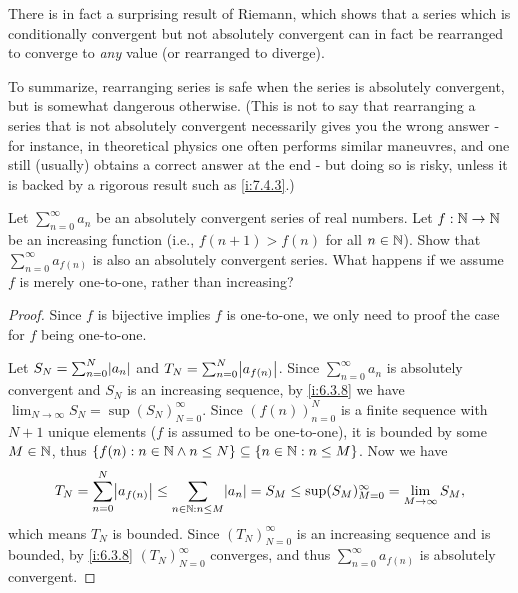 \begin{note}
  There is in fact a surprising result of Riemann, which shows that a series which is conditionally convergent but not absolutely convergent can in fact be rearranged to converge to \emph{any} value
  (or rearranged to diverge).
\end{note}

\begin{note}
  To summarize, rearranging series is safe when the series is absolutely convergent, but is somewhat dangerous otherwise.
  (This is not to say that rearranging a series that is not absolutely convergent necessarily gives you the wrong answer
  - for instance, in theoretical physics one often performs similar maneuvres, and one still (usually) obtains a correct answer at the end
  - but doing so is risky, unless it is backed by a rigorous result such as \cref{i:7.4.3}.)
\end{note}

\exercisesection

\begin{ex}\label{i:ex:7.4.1}
  Let \(\sum_{n = 0}^\infty a_n\) be an absolutely convergent series of real numbers.
  Let \(f : \mathbb{N} \to \mathbb{N}\) be an increasing function (i.e., \(f(n + 1) > f(n)\) for all \(n \in \mathbb{N}\)).
  Show that \(\sum_{n = 0}^\infty a_{f(n)}\) is also an absolutely convergent series.
  What happens if we assume \(f\) is merely one-to-one, rather than increasing?
\end{ex}

\begin{proof}
  Since \(f\) is bijective implies \(f\) is one-to-one, we only need to proof the case for \(f\) being one-to-one.

  Let \(S_N = \sum_{n = 0}^N \abs{a_n}\) and \(T_N = \sum_{n = 0}^N \abs{a_{f(n)}}\).
  Since \(\sum_{n = 0}^\infty a_n\) is absolutely convergent and \(S_N\) is an increasing sequence, by \cref{i:6.3.8} we have \(\lim_{N \to \infty} S_N = \sup(S_N)_{N = 0}^\infty\).
  Since \((f(n))_{n = 0}^N\) is a finite sequence with \(N + 1\) unique elements (\(f\) is assumed to be one-to-one), it is bounded by some \(M \in \mathbb{N}\), thus \(\left\lbrace f(n) : n \in \mathbb{N} \land n \leq N\right\rbrace \subseteq \left\lbrace n \in \mathbb{N} : n \leq M\right\rbrace\).
  Now we have
  \[
    T_N = \sum_{n = 0}^N \abs{a_{f(n)}} \leq \sum_{n \in \N : n \leq M} \abs{a_n} = S_M \leq \sup(S_M)_{M = 0}^\infty = \lim_{M \to \infty} S_M,
  \]
  which means \(T_N\) is bounded.
  Since \((T_N)_{N = 0}^\infty\) is an increasing sequence and is bounded, by \cref{i:6.3.8} \((T_N)_{N = 0}^\infty\) converges, and thus \(\sum_{n = 0}^\infty a_{f(n)}\) is absolutely convergent.
\end{proof}

